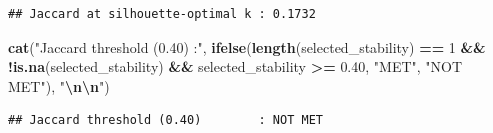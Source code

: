 \documentclass[
]{article}
\newenvironment{Shaded}{\begin{snugshade}}{\end{snugshade}}
\newcommand{\DecValTok}[1]{\textcolor[rgb]{0.00,0.00,0.81}{#1}}
\newcommand{\FloatTok}[1]{\textcolor[rgb]{0.00,0.00,0.81}{#1}}
\newcommand{\FunctionTok}[1]{\textcolor[rgb]{0.13,0.29,0.53}{\textbf{#1}}}
\newcommand{\NormalTok}[1]{#1}
\newcommand{\SpecialCharTok}[1]{\textcolor[rgb]{0.81,0.36,0.00}{\textbf{#1}}}
\newcommand{\StringTok}[1]{\textcolor[rgb]{0.31,0.60,0.02}{#1}}
\begin{document}
\begin{verbatim}
## Jaccard at silhouette-optimal k : 0.1732
\end{verbatim}

\begin{Shaded}
\begin{Highlighting}[]
\FunctionTok{cat}\NormalTok{(}\StringTok{"Jaccard threshold (0.40)        :"}\NormalTok{,}
    \FunctionTok{ifelse}\NormalTok{(}\FunctionTok{length}\NormalTok{(selected\_stability) }\SpecialCharTok{==} \DecValTok{1} \SpecialCharTok{\&\&}
             \SpecialCharTok{!}\FunctionTok{is.na}\NormalTok{(selected\_stability) }\SpecialCharTok{\&\&}
\NormalTok{             selected\_stability }\SpecialCharTok{\textgreater{}=} \FloatTok{0.40}\NormalTok{, }\StringTok{"MET"}\NormalTok{, }\StringTok{"NOT MET"}\NormalTok{), }\StringTok{"}\SpecialCharTok{\textbackslash{}n\textbackslash{}n}\StringTok{"}\NormalTok{)}
\end{Highlighting}
\end{Shaded}

\begin{verbatim}
## Jaccard threshold (0.40)        : NOT MET
\end{verbatim}
\end{document}

